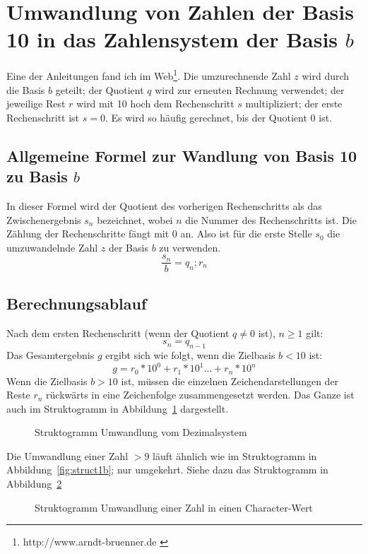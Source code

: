 \documentclass[a4paper,12pt,twoside]{book}
\begin{document}
\section{Umwandlung von Zahlen der Basis 10 in das Zahlensystem der Basis $b$}
Eine der Anleitungen fand ich im Web\footnote{http://www.arndt-bruenner.de \cite{zs:ab:2015}}.
Die umzurechnende Zahl $z$ wird durch die Basis $b$ geteilt; der Quotient $q$ wird zur erneuten Rechnung verwendet; der jeweilige Rest $r$ wird mit 10 hoch dem Rechenschritt $s$ multipliziert; der erste Rechenschritt ist $s = 0$. Es wird so häufig gerechnet, bis der Quotient 0 ist. 
\subsection{Allgemeine Formel zur Wandlung von Basis 10 zu Basis $b$}
In dieser Formel wird der Quotient des vorherigen Rechenschritts als das Zwischenergebnis $s_{n}$ bezeichnet, wobei $n$ die Nummer des Rechenschritts ist. Die Zählung der Rechenschritte fängt mit 0 an.
Also ist für die erste Stelle $s_{0}$ die umzuwandelnde Zahl $z$ der Basis $b$ zu verwenden.
\begin{equation}
\frac{s_{n}}{b} = q_{n} ; r_{n}
\label{eq:10-b}
\end{equation}
\subsection{Berechnungsablauf}
Nach dem ersten Rechenschritt (wenn der Quotient $q \neq 0$ ist), $n \geq 1$ gilt: 
\begin{equation}
s_{n}=q_{n-1}
\end{equation}
Das Gesamtergebnis $g$ ergibt sich wie folgt, wenn die Zielbasis $b < 10$ ist:
\begin{equation}
g = r_{0} * 10^0 + r_{1} * 10^1 \dots + r_{n} * 10^n
\label{eq:10-b_g9}
\end{equation}
Wenn die Zielbasis $b > 10$ ist, müssen die einzelnen Zeichendarstellungen der Reste $r_{n}$ rückwärts in eine Zeichenfolge zusammengesetzt werden. Das Ganze ist auch im Struktogramm in Abbildung~\ref{fig:struct2} dargestellt.
\begin{figure}
	
	\caption{Struktogramm Umwandlung vom Dezimalsystem}
	\label{fig:struct2}	
\end{figure}
Die Umwandlung einer Zahl $ > 9$ läuft ähnlich wie im Struktogramm in Abbildung~\ref{fig:struct1b}; nur umgekehrt. Siehe dazu das Struktogramm in Abbildung~\ref{fig:struct2b}
\begin{figure}
	
	\caption{Struktogramm Umwandlung einer Zahl in einen Character-Wert}
	\label{fig:struct2b}
\end{figure}


\appendix



\printindex
\end{document}
